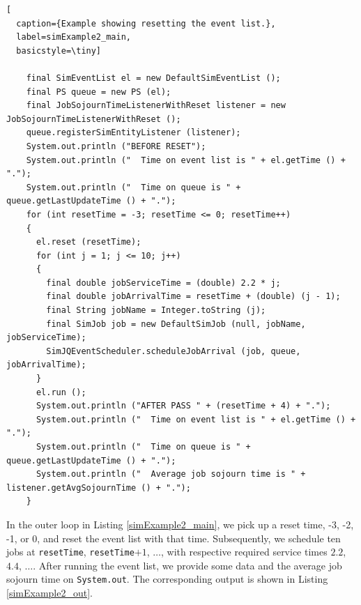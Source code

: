 \documentclass[12pt]{book}
\begin{document}
\begin{lstfloat}
\begin{lstlisting}[
  caption={Example showing resetting the event list.},
  label=simExample2_main,
  basicstyle=\tiny]

    final SimEventList el = new DefaultSimEventList ();
    final PS queue = new PS (el);
    final JobSojournTimeListenerWithReset listener = new JobSojournTimeListenerWithReset ();
    queue.registerSimEntityListener (listener);
    System.out.println ("BEFORE RESET");
    System.out.println ("  Time on event list is " + el.getTime () + ".");
    System.out.println ("  Time on queue is " + queue.getLastUpdateTime () + ".");
    for (int resetTime = -3; resetTime <= 0; resetTime++)
    {
      el.reset (resetTime);
      for (int j = 1; j <= 10; j++)
      {
        final double jobServiceTime = (double) 2.2 * j;
        final double jobArrivalTime = resetTime + (double) (j - 1);
        final String jobName = Integer.toString (j);
        final SimJob job = new DefaultSimJob (null, jobName, jobServiceTime);
        SimJQEventScheduler.scheduleJobArrival (job, queue, jobArrivalTime);
      }
      el.run ();
      System.out.println ("AFTER PASS " + (resetTime + 4) + ".");
      System.out.println ("  Time on event list is " + el.getTime () + ".");
      System.out.println ("  Time on queue is " + queue.getLastUpdateTime () + ".");
      System.out.println ("  Average job sojourn time is " + listener.getAvgSojournTime () + ".");
    }

\end{lstlisting}
\end{lstfloat}

In the outer loop in Listing \ref{simExample2_main},
  we pick up a reset time,
  -3, -2, -1, or 0,
  and reset the event list with that time.
Subsequently, we schedule ten jobs
  at \lstinline|resetTime|, \lstinline|resetTime|$+1$, $\ldots$,
  with respective required service times
  $2.2$, $4.4$, $\ldots$.
After running the event list,
  we provide some data and the average job sojourn time on \lstinline|System.out|.
The corresponding output is shown in Listing \ref{simExample2_out}.
\end{document}
